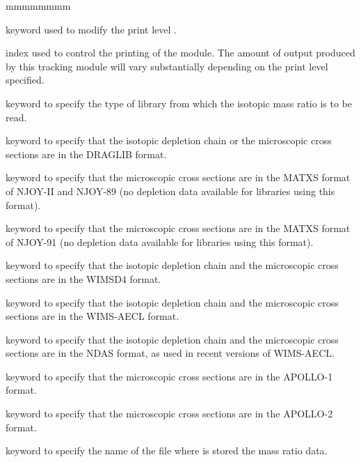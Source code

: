 \begin{ListeDeDescription}{mmmmmmmm}

\item[\moc{EDIT}] keyword used to modify the print level .

\item[\dusa{iprint}] index used to control the printing of the module. The
amount of output produced by this tracking module will vary substantially
depending on the print level specified.

\item[\moc{LIB:}] keyword to specify the type of library from which the
isotopic mass ratio is to be read. 

\item[\moc{DRAGON}] keyword to specify that the isotopic depletion chain or
the microscopic cross sections are in the DRAGLIB format.

\item[\moc{MATXS}] keyword to specify that the microscopic cross sections are
in the MATXS format of NJOY-II and NJOY-89 (no depletion data available for
libraries using this format).

\item[\moc{MATXS2}] keyword to specify that the microscopic cross sections are
in the MATXS format of NJOY-91  (no depletion data available for libraries using
this format).

\item[\moc{WIMSD4}] keyword to specify that the isotopic depletion chain and the
microscopic cross sections are in the WIMSD4 format.

\item[\moc{WIMSAECL}] keyword to specify that the isotopic depletion chain and the
microscopic cross sections are in the WIMS-AECL format.

\item[\moc{NDAS}] keyword to specify that the isotopic depletion chain and the
microscopic cross sections are in the NDAS format, as used in recent versions of WIMS-AECL.

\item[\moc{APLIB1}] keyword to specify that the microscopic cross sections are
in the APOLLO-1 format.

\item[\moc{APLIB2}] keyword to specify that the microscopic cross sections are
in the APOLLO-2 format.

\item[\moc{FIL:}] keyword to specify the name of the file where is  stored the mass
ratio data. 


\end{ListeDeDescription}

